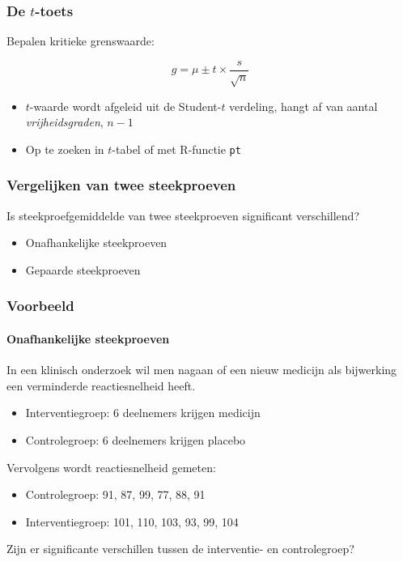 \documentclass{beamer}
\begin{document}
\begin{frame}
  \frametitle{De $t$-toets}
  
  Bepalen kritieke grenswaarde:
  
  \[ g = \mu \pm t \times \frac{s}{\sqrt{n}} \]
  
  \begin{itemize}
    \item $t$-waarde wordt afgeleid uit de Student-$t$ verdeling, hangt af van aantal \emph{vrijheidsgraden}, $n-1$
    \item Op te zoeken in $t$-tabel of met R-functie \texttt{pt}
  \end{itemize}
  
\end{frame}

\begin{frame}
  \frametitle{Vergelijken van twee steekproeven}
  
  Is steekproefgemiddelde van twee steekproeven significant verschillend?
  
  \begin{itemize}
    \item Onafhankelijke steekproeven
    \item Gepaarde steekproeven
  \end{itemize}
\end{frame}

\begin{frame}
  \frametitle{Voorbeeld}
  \framesubtitle{Onafhankelijke steekproeven}
  
  In een klinisch onderzoek wil men nagaan of een nieuw medicijn als bijwerking een verminderde reactiesnelheid heeft.
  
  \begin{itemize}
    \item Interventiegroep: 6 deelnemers krijgen medicijn
    \item Controlegroep: 6 deelnemers krijgen placebo
  \end{itemize}
  
  Vervolgens wordt reactiesnelheid gemeten:
  
  \begin{itemize}
    \item Controlegroep: 91, 87, 99, 77, 88, 91
    \item Interventiegroep: 101, 110, 103, 93, 99, 104
  \end{itemize}
  
  Zijn er significante verschillen tussen de interventie- en controlegroep?
\end{frame}
\end{document}
